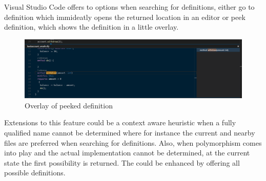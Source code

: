 Visual Studio Code offers to options when searching for definitions, either go to definition which immideatly opens the returned location in an editor or peek definition, which shows the definition in a little overlay. \newline
 \begin{figure}[H]
	\centering
	\includegraphics[width=1\textwidth]{img/goToDefinitionPeek}
	\caption{Overlay of peeked definition}
	\label{fig:gotodefinitionpeek}
\end{figure}
Extensions to this feature could be a context aware heuristic when a fully qualified name cannot be determined where for instance the current and nearby files are preferred when searching for definitions. Also, when polymorphism comes into play and the actual implementation cannot be determined, at the current state the first possibility is returned. The could be enhanced by offering all possible definitions.


